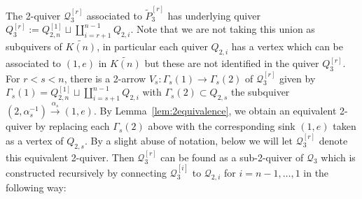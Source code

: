 \documentclass{amsart}
\numberwithin{equation}{section}
\newcommand{\cQ}{\mathcal{Q}}
\begin{document}
The 2-quiver $\cQ_3^{[r]}$ associated to $\tilde P_3^{[r]}$ has underlying quiver $Q_3^{[r]}:=Q_{2,n}^{[1]}\sqcup\coprod\limits_{i=r+1}^{n-1} Q_{2,i}$.
Note that we are not taking this union as subquivers of $\widetilde{K(n)}$, in particular each quiver $Q_{2,i}$ has a vertex which can be associated to $(1,e)$ in $\widetilde{K(n)}$ but these are not identified in the quiver $Q_3^{[r]}$. 
For $r<s<n$, there is a 2-arrow $V_s:\Gamma_s(1)\to\Gamma_s(2)$ of $\cQ_3^{[r]}$ given by $\Gamma_s(1)=Q_{2,n}^{[1]}\sqcup\coprod\limits_{i=s+1}^{n-1} Q_{2,i}$ with $\Gamma_s(2)\subset Q_{2,s}$ the subquiver $(2,\alpha_s^{-1})\xrightarrow{\alpha_s} (1,e)$.
By Lemma~\ref{lem:2equivalence}, we obtain an equivalent 2-quiver by replacing each $\Gamma_s(2)$ above with the corresponding sink $(1,e)$ taken as a vertex of $Q_{2,s}$.
By a slight abuse of notation, below we will let $\cQ_3^{[r]}$ denote this equivalent 2-quiver.
Then $\cQ_3^{[r]}$ can be found as a sub-2-quiver of $\cQ_3$ which is constructed recursively by connecting $\cQ_3^{[i]}$ to $\cQ_{2,i}$ for $i=n-1,\ldots, 1$ in the following way: \\
\end{document}
